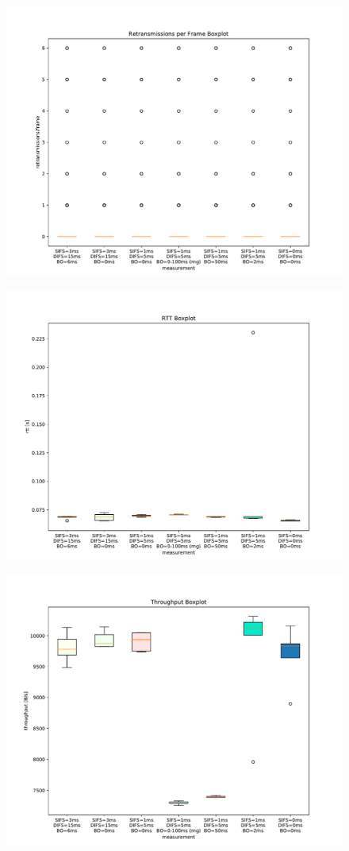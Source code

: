 \documentclass{article}
\begin{document}
\begin{figure}
	\includegraphics[width=\textwidth]{boxplot/retransmissions_per_frame_boxplot}
\end{figure}

\begin{figure}
	\includegraphics[width=\textwidth]{boxplot/rtt_boxplot}
\end{figure}

\begin{figure}
	\includegraphics[width=\textwidth]{boxplot/throughput_boxplot}
\end{figure}
\end{document}
